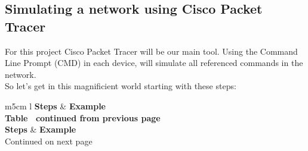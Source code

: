 \documentclass[11pt,a4paper]{report}
\begin{document}
    \subsection{Simulating a network using Cisco Packet Tracer}
        For this project Cisco Packet Tracer will be our main tool. Using the Command Line Prompt (CMD) in each device, will simulate all referenced commands in the network.\\
        So let's get in this magnificient world starting with these steps:\\
        \begin{flushleft}
                \begin{center}
                    \begin{longtable}{ m{5cm} l }
                        \textbf{Steps} & \textbf{Example} \\
                        \hline
                        \endfirsthead
                        {{\bfseries Table \thetable\ continued from previous page}} \\
                        \textbf{Steps} & \textbf{Example} \\
                        \hline
                        \endhead
                        \hline Continued on next page \\
                        \endfoot
                        \endlastfoot


\end{longtable}
\end{center}
\end{flushleft}
\end{document}

